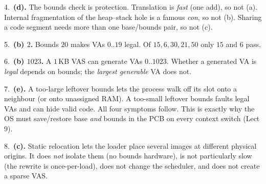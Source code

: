 \documentclass[11pt,a4paper]{article}
\newenvironment{Sol}{%
  \begin{tcolorbox}[sboxstyle, title={Solution}]%
}{%
  \end{tcolorbox}\vspace{0.35em}%
}
\begin{document}
\begin{Sol}
4.\ \textbf{(d).} The bounds check is protection. Translation is
\emph{fast} (one add), so not (a). Internal fragmentation of the
heap--stack hole is a famous \emph{con}, so not (b). Sharing a code
segment needs more than one base/bounds pair, so not (c).

5.\ \textbf{(b) $2$.} Bounds $20$ makes VAs $0..19$ legal. Of
$15,6,30,21,50$ only $15$ and $6$ pass.

6.\ \textbf{(b) $1023$.} A $1$\,KB VAS can generate VAs $0..1023$.
Whether a generated VA is \emph{legal} depends on bounds; the
\emph{largest generable} VA does not.

7.\ \textbf{(e).} A too-large leftover bounds lets the process walk
off its slot onto a neighbour (or onto unassigned RAM). A too-small
leftover bounds faults legal VAs and can hide valid code. All four
symptoms follow. This is exactly why the OS must
save/restore base \emph{and} bounds in the PCB on every context
switch (Lect 9).

8.\ \textbf{(c).} Static relocation lets the loader place several
images at different physical origins. It does \emph{not} isolate them
(no bounds hardware), is not particularly slow (the rewrite is
once-per-load), does not change the scheduler, and does not create a
sparse VAS.
\end{Sol}
\end{document}
